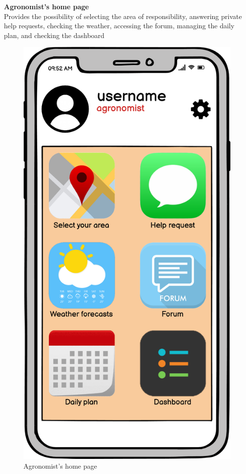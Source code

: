 \textbf{Agronomist's home page} \\
Provides the possibility of selecting the area of responsibility, answering private help requests,
checking the weather, accessing the forum, managing the daily plan, and checking the dashboard
\begin{figure}[H]
    \centering
    \includegraphics[scale=0.40]{Images/agronomistHomePage.png}
    \caption{Agronomist's home page}
\end{figure}

